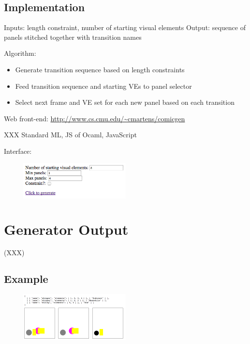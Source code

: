 \subsection{Implementation}

Inputs: length constraint, number of starting visual elements
Output: sequence of panels stitched together with transition names

Algorithm:
\begin{itemize}
\item Generate transition sequence based on length constraints
\item Feed transition sequence and starting VEs to panel selector
\item Select next frame and VE set for each new panel based on each
transition
\end{itemize}

Web front-end:
\url{http://www.cs.cmu.edu/~cmartens/comicgen}

XXX Standard ML, JS of Ocaml, JavaScript

Interface:
\begin{figure}[h]
\includegraphics[width=0.5\textwidth]{comicgen-interface.png}
\end{figure}


\section{Generator Output}

(XXX)

\subsection{Example}

\begin{figure}
\includegraphics[width=0.5\textwidth]{comicgen-output-1.png}
\end{figure}

